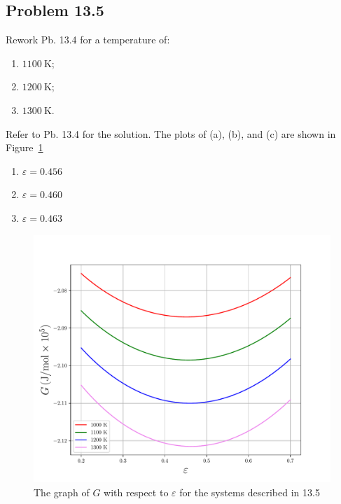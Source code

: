 \subsection*{Problem 13.5}
Rework Pb. 13.4 for a temperature of:
\begin{enumerate}[label=(\alph*)]
  \item \(1100~\unit{\kelvin}\);
  \item \(1200~\unit{\kelvin}\);
  \item \(1300~\unit{\kelvin}\).
\end{enumerate}

\begin{solution}
  Refer to Pb. 13.4 for the solution.
  The plots of (a), (b), and (c) are shown in Figure~\ref{fig:13.5}
  \begin{enumerate}[label=(\alph*)]
    \item \(\boxed{\varepsilon=0.456}\)
    \item \(\boxed{\varepsilon=0.460}\)
    \item \(\boxed{\varepsilon=0.463}\)
  \end{enumerate}
\end{solution}

\begin{figure}[H]
  \centering
  \includegraphics[scale=0.5]{assets/13_5.pdf}
  \caption{The graph of \(G\) with respect to \(\varepsilon\) for the
  systems described in 13.5}
  \label{fig:13.5}
\end{figure}

